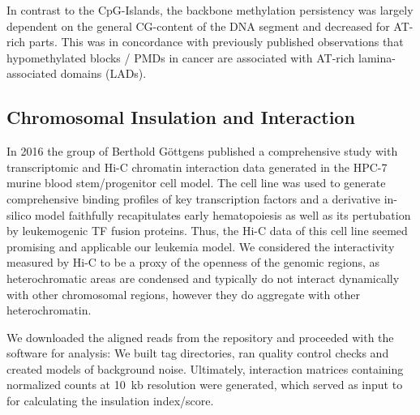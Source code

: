 In contrast to the CpG-Islands, the backbone methylation persistency was largely dependent on the general CG-content of the DNA segment and decreased for AT-rich parts. This was in concordance with previously published observations that hypomethylated blocks / PMDs in cancer are associated with AT-rich lamina-associated domains (LADs)\cite{Berman2012,Timp2014}.

\FloatBarrier
\subsection{Chromosomal Insulation and Interaction}
\label{chap:r:gam:chromatin:hic}

In 2016 the group of Berthold Göttgens published a comprehensive study with transcriptomic and Hi-C chromatin interaction data generated in the HPC-7 murine blood stem/progenitor cell model\cite{Wilson2016}. The cell line was used to generate comprehensive binding profiles of key transcription factors\cite{Wilson2010,Calero-Nieto2014} and a derivative in-silico model faithfully recapitulates early hematopoiesis as well as its pertubation by leukemogenic TF fusion proteins\cite{Schuette2016}. Thus, the Hi-C data of this cell line seemed promising and applicable our \mllafnine \kitpos leukemia model. We considered the interactivity measured by Hi-C to be a proxy of the openness of the genomic regions, as heterochromatic areas are condensed and typically do not interact dynamically with other chromosomal regions, however they do aggregate with other heterochromatin. 

We downloaded the aligned reads from the  repository and proceeded with the software  for analysis: We built tag directories, ran quality control checks and created models of background noise. Ultimately, interaction matrices containing normalized counts at \SI{10}{\kilo b} resolution were generated, which served as input to \cite{Kruse2016} for calculating the insulation index/score\cite{Crane2015}.

